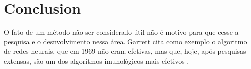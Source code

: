 \chapter{Conclusion}

O fato de um método não ser considerado útil não é motivo para que cesse a pesquisa e o desnvolvimento nessa área. Garrett cita como exemplo o algoritmo de redes neurais, que em 1969 não eram efetivas, mas que, hoje, após pesquisas extensas, são um dos algoritmos imunológicos mais efetivos \cite{Garrett2005}.
